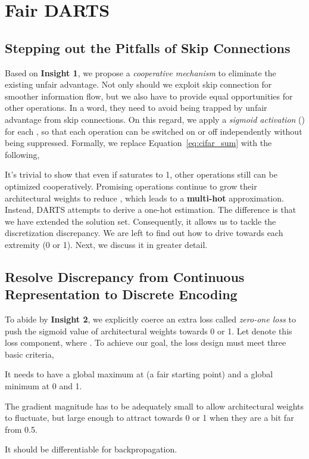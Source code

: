 \documentclass[runningheads]{llncs}
\begin{document}
 

















\section{Fair DARTS}
\subsection{Stepping out the Pitfalls of Skip Connections}

Based on \textbf{Insight 1}, we propose a \emph{cooperative mechanism} to eliminate the existing unfair advantage. Not only should we exploit skip connection for smoother information flow, but we also have to provide equal opportunities for other operations. In a word, they need to avoid being trapped by unfair advantage from skip connections. On this regard, we apply a \emph{sigmoid activation} () for each , so that each operation can be switched on or off independently without being suppressed. Formally, we replace Equation~\ref{eq:cifar_sum} with the following,



It's trivial to show that even if  saturates to 1, other operations still can be optimized cooperatively. Promising operations continue to grow their architectural weights to reduce , which leads to a \textbf{multi-hot} approximation. Instead, DARTS attempts to derive a one-hot estimation. The difference is that we have extended the solution set. Consequently, it allows us to tackle the discretization discrepancy. We are left to find out how to drive  towards each extremity (0 or 1). Next, we discuss it in greater detail.


\subsection{Resolve Discrepancy from Continuous Representation to Discrete Encoding}{\label{sec:loss}}
To abide by \textbf{Insight 2}, we explicitly coerce an extra loss called \emph{zero-one loss} to push the sigmoid value of architectural weights towards 0 or 1. Let  denote this loss component, where .  To achieve our goal, the loss design must meet three basic criteria, 
\begin{enumerate*}
\item It needs to have a global maximum at  (a fair starting point) and a global minimum at 0 and 1.
\item The gradient magnitude  has to be adequately small to allow architectural weights to fluctuate, but large enough to attract  towards 0 or 1 when they are a bit far from 0.5.
\item It should be differentiable for backpropagation. 
\end{enumerate*}
\end{document}
